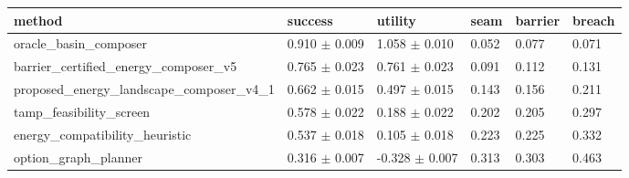 \begin{tabular}{llllll}
\toprule
method & success & utility & seam & barrier & breach \\
\midrule
oracle\_basin\_composer & 0.910 $\pm$ 0.009 & 1.058 $\pm$ 0.010 & 0.052 & 0.077 & 0.071 \\
barrier\_certified\_energy\_composer\_v5 & 0.765 $\pm$ 0.023 & 0.761 $\pm$ 0.023 & 0.091 & 0.112 & 0.131 \\
proposed\_energy\_landscape\_composer\_v4\_1 & 0.662 $\pm$ 0.015 & 0.497 $\pm$ 0.015 & 0.143 & 0.156 & 0.211 \\
tamp\_feasibility\_screen & 0.578 $\pm$ 0.022 & 0.188 $\pm$ 0.022 & 0.202 & 0.205 & 0.297 \\
energy\_compatibility\_heuristic & 0.537 $\pm$ 0.018 & 0.105 $\pm$ 0.018 & 0.223 & 0.225 & 0.332 \\
option\_graph\_planner & 0.316 $\pm$ 0.007 & -0.328 $\pm$ 0.007 & 0.313 & 0.303 & 0.463 \\
\bottomrule
\end{tabular}
